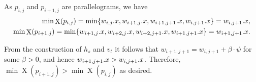 \documentclass[twoside,leqno]{article}
\DeclareMathOperator*{\X}{X}
\begin{document}
As $p_{i,j}$ and $p_{i+1,j}$ are parallelograms, we have 
\begin{align*}
\min \X(p_{i, j}) = \min\{\x{w_{i, j}}, \x{w_{i + 1,j}}, \x{w_{i + 1,j + 1}},\x{w_{i,j + 1}}\} = \x{w_{i,j + 1}},\\ 
\min \X(p_{i+1, j}) = \min\{\x{w_{i + 1, j}}, \x{w_{i + 2, j}}, \x{w_{i + 2,j + 1}},\x{w_{i+1,j + 1}}\} = \x{w_{i + 1,j + 1}}.
\end{align*}

From the construction of $h_s$ and $v_t$ it follows that $w_{i + 1,j + 1} = w_{i,j+1} + \beta \cdot \psi$ for some $\beta > 0$, and hence $w_{i + 1,j + 1}.x > w_{i,j + 1}.x$. Therefore, $\min \X(p_{i+1, j}) > \min \X(p_{i, j})$ as desired. 
\end{document}
